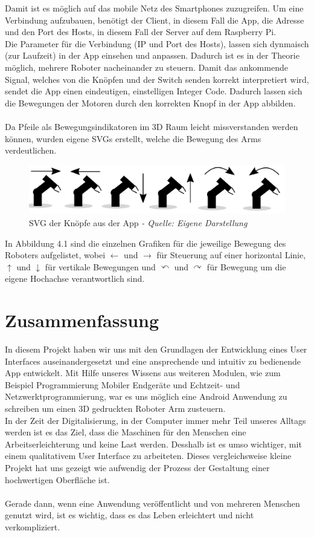 \documentclass[12pt,					%
							 oneside,			%
							 a4paper,			%
							 halfparskip,		%
							 liststotoc,			%
							 bibtotoc,			%
							 fleqn,				%
							 pointlessnumbers]	%
							 {scrreprt}
\begin{document}
Damit ist es möglich auf das mobile Netz des Smartphones zuzugreifen. Um eine Verbindung aufzubauen, benötigt der Client, in diesem Fall die App, die Adresse und den Port des Hosts, in diesem Fall der Server auf dem Raspberry Pi. \\
Die Parameter für die Verbindung (IP und Port des Hosts), lassen sich dynmaisch (zur Laufzeit) in der App einsehen und anpassen. Dadurch ist es in der Theorie möglich, mehrere Roboter nacheinander zu steuern. 
Damit das ankommende Signal, welches von die Knöpfen und der Switch senden korrekt interpretiert wird, sendet die App einen eindeutigen, einstelligen Integer Code. Dadurch lassen sich die Bewegungen der Motoren durch den korrekten Knopf in der App abbilden. \\ \\
Da Pfeile als Bewegungsindikatoren im 3D Raum leicht missverstanden werden können, wurden eigene SVGs erstellt, welche die Bewegung des Arms verdeutlichen. \\
\begin{figure}[h]
	\centering
	\includegraphics[scale=0.3]{pictures/robissvg.jpg}
	\caption{SVG der Knöpfe aus der App \textit{- Quelle: Eigene Darstellung}}
\end{figure}
\newpage
In Abbildung 4.1 sind die einzelnen Grafiken für die jeweilige Bewegung des Roboters aufgelistet, wobei $\leftarrow$ und $\rightarrow$ für Steuerung auf einer horizontal Linie, $\uparrow$ und $\downarrow$ für vertikale Bewegungen und $\curvearrowleft$ und $\curvearrowright$ für Bewegung um die eigene Hochachse verantwortlich sind.
\chapter{Zusammenfassung}	
In diesem Projekt haben wir uns mit den Grundlagen der Entwicklung eines User Interfaces auseinandergesetzt und eine ansprechende und intuitiv zu bedienende App entwickelt. Mit Hilfe unseres Wissens aus weiteren Modulen, wie zum Beispiel \glqq{}Programmierung Mobiler Endgeräte\grqq{} und \glqq{}Echtzeit- und Netzwerktprogrammierung\grqq{}, war es uns möglich eine Android Anwendung zu schreiben um einen 3D gedruckten Roboter Arm zusteuern. 
\\
In der Zeit der Digitalisierung, in der Computer immer mehr Teil unseres Alltags werden ist es das Ziel, dass die Maschinen für den Menschen eine Arbeitserleichterung und keine Last werden. Desshalb ist es umso wichtiger, mit einem qualitativem User Interface zu arbeiteten. Dieses vergleichsweise kleine Projekt hat uns gezeigt wie aufwendig der Prozess der Gestaltung einer hochwertigen Oberfläche ist.\\ \\
Gerade dann, wenn eine Anwendung veröffentlicht und von mehreren Menschen genutzt wird, ist es wichtig, dass es das Leben erleichtert und nicht verkompliziert.
\end{document}
